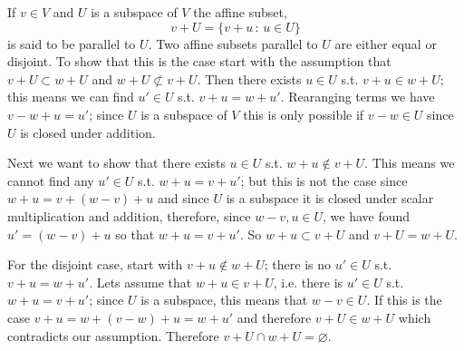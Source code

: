 \documentclass[11pt,a4paper]{scrartcl}
\begin{document}
If $v \in V$ and $U$ is a subspace of $V$ the affine subset,
\[
v+U = \{v+u \, : \, u \in U \}    
\]
is said to be parallel  to $U$. Two affine subsets parallel to $U$ are either equal or disjoint.
To show that this is the case start with the assumption that $v+U \subset w+U$ and $w+U \not\subset v+U$.
Then there exists $u \in U$ s.t. $v+u \in w+U$; this means we can find $u' \in U$ s.t. $v+u=w+u'$. 
Rearanging terms we have $v-w+u=u'$; since $U$ is a subspace of $V$ this is only possible if $v-w \in U$
since $U$ is closed under addition. 

Next we want to show that there exists $u \in U$ s.t. $w+u \not\in v+U$. This means we cannot find any
$u' \in U$ s.t. $w+u = v+u'$; but this is not the case since $w+u=v+(w-v)+u$ and since $U$ is a subspace 
it is closed under scalar multiplication and addition, therefore, since $w-v, u \in U$, we have found
$u'=(w-v)+u$ so that $w+u = v+u'$. So $w+u \subset v+U$ and $v+U = w+U$.

For the disjoint case, start with $v+u \not\in w+U$; there is no $u' \in U$ s.t. $v+u=w+u'$. Lets assume
that $w+u \in v+U$, i.e. there is $u' \in U$ s.t. $w+u=v+u'$; since $U$ is a subspace, this means that
$w-v \in U$. If this is the case $v+u = w + (v-w)+u = w+u'$ and therefore $v+U \in w+U$ which contradicts our 
assumption. Therefore $v+U \cap w+U = \varnothing$.
\end{document}
